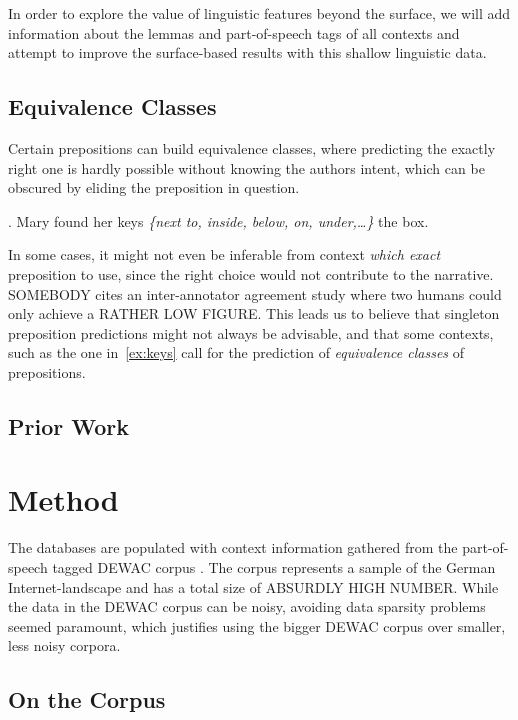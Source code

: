 \documentclass[draft,12pt]{article}
\begin{document}
In order to explore the value of linguistic features beyond the surface, we will
add information about the lemmas and part-of-speech tags of all contexts and
attempt to improve the surface-based results with this shallow linguistic data.

\subsection{Equivalence Classes} %
\label{sec:eqclass}              %
Certain prepositions can build equivalence classes, where
predicting the exactly right one is hardly possible without knowing the authors
intent, which can be obscured by eliding the preposition in question.

\ex. Mary found her keys \textit{\{next to, inside, below, on, under,\ldots{}\}} the box.
\label{ex:keys}

In some cases, it might not even be inferable from context \textit{which exact}
preposition to use, since the right choice would not contribute to the
narrative. SOMEBODY %
cites an inter-annotator agreement study where two humans could only achieve a
RATHER LOW FIGURE. %
This leads us to believe that singleton preposition predictions might not always
be advisable, and that some contexts, such as the one in~\ref{ex:keys} call for
the prediction of \textit{equivalence classes} of prepositions.

\subsection{Prior Work}

\section{Method}

The databases are populated with context information gathered from the
part-of-speech tagged DEWAC corpus \citep{baroniETAL2008}. The corpus represents
a sample of the German Internet-landscape and has a total size of ABSURDLY HIGH
NUMBER. %
While the data in the DEWAC corpus can be noisy, avoiding data sparsity
problems seemed paramount, which justifies using the bigger DEWAC
corpus over smaller, less noisy corpora.

\subsection{On the Corpus}
\end{document}

